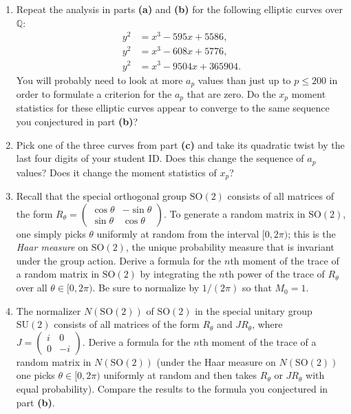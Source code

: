 \documentclass[11pt]{article}
\newcommand{\Q}{\mathbb{Q}}
\newcommand{\SO}{\mathrm{SO}}
\newcommand{\SU}{\mathrm{SU}}
\begin{document}
\begin{enumerate}
\item[\textbf{(c)}] Repeat the analysis in parts \textbf{(a)} and \textbf{(b)} for the following elliptic curves over $\Q$:
\begin{align*}
y^2 &= x^3-595x+5586,\\
y^2 &= x^3-608x+5776,\\
y^2 &= x^3 - 9504x + 365904.
\end{align*}
You will probably need to look at more $a_p$ values than just up to $p\le 200$ in order to formulate a criterion for the $a_p$ that are zero.  Do the $x_p$ moment statistics for these elliptic curves appear to converge to the same sequence you conjectured in part \textbf{(b)}?

\item[\textbf{(d)}] Pick one of the three curves from part \textbf{(c)} and take its quadratic twist by the last four digits of your student ID.
Does this change the sequence of $a_p$ values?
Does it change the moment statistics of $x_p$?

\item[\textbf{(e)}] Recall that the special orthogonal group $\SO(2)$ consists of all matrices of the form $R_\theta = \left(\begin{smallmatrix}\cos \theta&-\sin\theta\\\sin\theta&\cos\theta\end{smallmatrix}\right)$.
To generate a random matrix in $\SO(2)$, one simply picks $\theta$ uniformly at random from the interval $[0,2\pi)$; this is the \emph{Haar measure} on $\SO(2)$, the unique probability measure that is invariant under the group action.
Derive a formula for the $n$th moment of the trace of a random matrix in $\SO(2)$ by integrating the $n$th power of the trace of $R_\theta$ over all $\theta\in[0,2\pi)$.  Be sure to normalize by $1/(2\pi)$ so that $M_0=1$.

\item[\textbf{(f)}] The normalizer $N(\SO(2))$ of $\SO(2)$ in the special unitary group $\SU(2)$ consists of all matrices of the form $R_\theta$ and $JR_\theta$, where $J= \left(\begin{smallmatrix}i&0\\0&-i\end{smallmatrix}\right)$.  Derive a formula for the $n$th moment of the trace of a random matrix in $N(\SO(2))$ (under the Haar measure on $N(\SO(2))$ one picks $\theta\in [0,2\pi)$ uniformly at random and then takes $R_\theta$ or $JR_\theta$ with equal probability).
Compare the results to the formula you conjectured in part \textbf{(b)}.
\end{enumerate}
\end{document}
